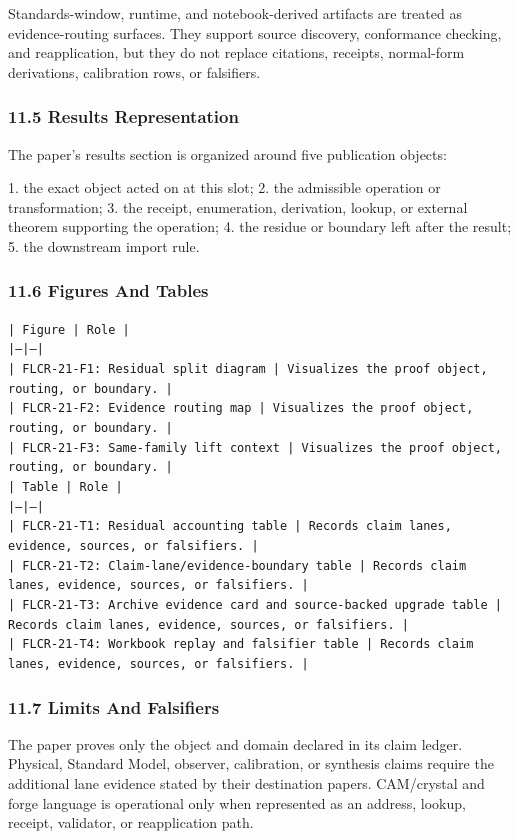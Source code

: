 \documentclass[11pt]{article}
\begin{document}
Standards-window, runtime, and notebook-derived artifacts are treated
as evidence-routing surfaces. They support source discovery, conformance
checking, and reapplication, but they do not replace citations, receipts,
normal-form derivations, calibration rows, or falsifiers.

\subsubsection*{11.5 Results Representation}

The paper's results section is organized around five publication objects:

1. the exact object acted on at this slot;
2. the admissible operation or transformation;
3. the receipt, enumeration, derivation, lookup, or external theorem supporting
   the operation;
4. the residue or boundary left after the result;
5. the downstream import rule.

\subsubsection*{11.6 Figures And Tables}

\noindent\texttt{| Figure | Role |}\\
\noindent\texttt{|---|---|}\\
\noindent\texttt{| FLCR-21-F1: Residual split diagram | Visualizes the proof object, routing, or boundary. |}\\
\noindent\texttt{| FLCR-21-F2: Evidence routing map | Visualizes the proof object, routing, or boundary. |}\\
\noindent\texttt{| FLCR-21-F3: Same-family lift context | Visualizes the proof object, routing, or boundary. |}\\

\noindent\texttt{| Table | Role |}\\
\noindent\texttt{|---|---|}\\
\noindent\texttt{| FLCR-21-T1: Residual accounting table | Records claim lanes, evidence, sources, or falsifiers. |}\\
\noindent\texttt{| FLCR-21-T2: Claim-lane/evidence-boundary table | Records claim lanes, evidence, sources, or falsifiers. |}\\
\noindent\texttt{| FLCR-21-T3: Archive evidence card and source-backed upgrade table | Records claim lanes, evidence, sources, or falsifiers. |}\\
\noindent\texttt{| FLCR-21-T4: Workbook replay and falsifier table | Records claim lanes, evidence, sources, or falsifiers. |}\\

\subsubsection*{11.7 Limits And Falsifiers}

The paper proves only the object and domain declared in its claim ledger.
Physical, Standard Model, observer, calibration, or synthesis claims require
the additional lane evidence stated by their destination papers. CAM/crystal
and forge language is operational only when represented as an address, lookup,
receipt, validator, or reapplication path.
\end{document}
